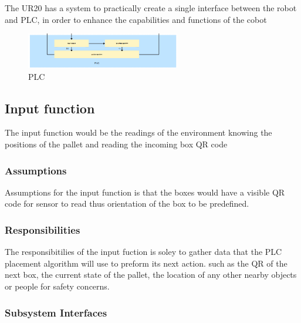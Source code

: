 The UR20 has a system to practically create a single interface between the robot and PLC, in order to enhance the capabilities and functions of the cobot

\begin{figure}[h!]
	\centering
 	\includegraphics[width=0.60\textwidth]{images/Plc}
 \caption{PLC }
\end{figure}

\subsection{Input function}
The input function would be the readings of the environment knowing the positions of the pallet and reading the incoming box QR code 

\subsubsection{Assumptions}
Assumptions for the input function is that the boxes would have a visible QR code for sensor to read thus orientation of the box to be predefined. 

\subsubsection{Responsibilities}
The responsibitilies of the input fuction is soley to gather data that the PLC placement algorithm will use to preform its next action. such as the QR of the next box, the current state of the pallet, the location of any other nearby objects or people for safety concerns.

\subsubsection{Subsystem Interfaces}

